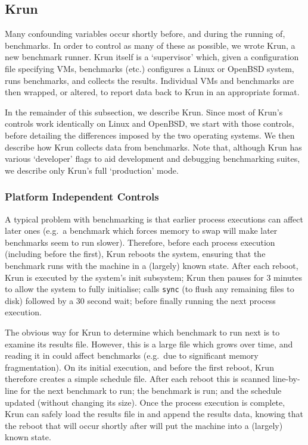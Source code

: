 \documentclass[preprint,numbers,10pt]{sigplanconf}
\newcommand{\krun}{Krun\xspace}
\begin{document}
\subsection{\krun}
\label{krun}

Many confounding variables occur shortly before, and during the running of,
benchmarks. In order to control as many of these as possible, we wrote
\krun, a new benchmark runner. \krun itself is a `supervisor'
which, given a configuration file specifying VMs, benchmarks (etc.) configures
a Linux or OpenBSD system, runs benchmarks, and collects the results. Individual VMs and benchmarks
are then wrapped, or altered, to report data back to \krun in an appropriate format.

In the remainder of this subsection, we describe \krun. Since most of \krun's
controls work identically on Linux and OpenBSD, we start with those controls,
before detailing the differences imposed by the two operating systems. We then
describe how \krun collects data from benchmarks.
Note that, although \krun has various `developer' flags to aid development
and debugging benchmarking suites, we describe only \krun's full `production' mode.


\subsubsection{Platform Independent Controls}

A typical problem with benchmarking is that earlier process executions can
affect later ones (e.g.~a benchmark which forces memory to swap will make
later benchmarks seem to run slower). Therefore, before each process execution
(including before the first), \krun reboots the system, ensuring that the
benchmark runs with the machine in a (largely) known state. After each reboot, \krun is
executed by the system's init subsystem; \krun then pauses for 3
minutes to allow the system to fully initialise; calls \texttt{sync} (to
flush any remaining files to disk) followed by a 30 second wait; before finally running the
next process execution.

The obvious way for \krun to determine which benchmark to run next is to examine
its results file. However, this is a large file which grows over time, and
reading it in could affect benchmarks (e.g.~due to significant memory
fragmentation). On its initial execution, and before the first reboot, \krun
therefore creates a simple schedule file. After each reboot this is scanned
line-by-line for the next benchmark to run; the benchmark is run; and the schedule
updated (without changing its size). Once the process execution is
complete, \krun can safely load the results file in and append the results data,
knowing that the reboot that will occur shortly after will put the machine into
a (largely) known state.
\end{document}
